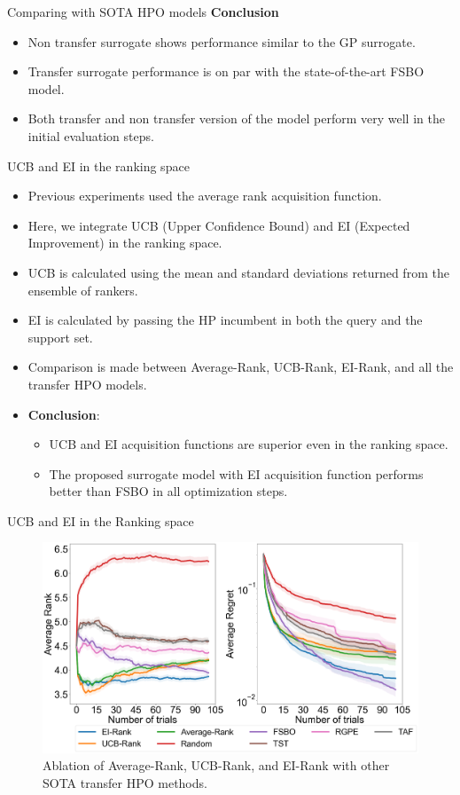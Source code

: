 \documentclass{beamer}
\begin{document}
\begin{frame}[t]{Comparing with SOTA HPO models}
\textbf{Conclusion}
\begin{itemize}
\item Non transfer surrogate shows performance similar to the GP surrogate.
\item Transfer surrogate performance is on par with the state-of-the-art FSBO model.
\item Both transfer and non transfer version of the model perform very well in the initial evaluation steps.
\end{itemize}
\end{frame}

\begin{frame}[t]{UCB and EI in the ranking space}
\begin{itemize}
\item Previous experiments used the average rank acquisition function.
\item Here, we integrate UCB (Upper Confidence Bound) and EI (Expected Improvement) in the ranking space.
\item UCB is calculated using the mean and standard deviations returned from the ensemble of rankers.
\item EI is calculated by passing the HP incumbent in both the query and the support set.
\item Comparison is made between Average-Rank,  UCB-Rank,  EI-Rank, and all the transfer HPO models.
\item \textbf{Conclusion}:
\begin{itemize}
\item UCB and EI acquisition functions are superior even in the ranking space. \item The proposed surrogate model with EI  acquisition function performs better than FSBO in all optimization steps.
\end{itemize}
\end{itemize}
\end{frame}

\begin{frame}[t]{UCB and EI in the Ranking space}
\begin{figure}[h]
  \centering
    \includegraphics[scale=0.20]{images/acqusitionRanking}
    \caption{Ablation of Average-Rank, UCB-Rank, and EI-Rank with other SOTA transfer HPO methods.}
    \label{fig:acqusitionRanking}
\end{figure}

\end{frame}
\end{document}
